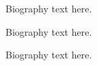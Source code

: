 \documentclass[10pt,journal,compsoc]{IEEEtran}
\begin{document}
\begin{IEEEbiography}{ }
Biography text here.
\end{IEEEbiography}

\begin{IEEEbiographynophoto}{ }
Biography text here.
\end{IEEEbiographynophoto}


\begin{IEEEbiographynophoto}{ }
Biography text here.
\end{IEEEbiographynophoto}






\end{document}
